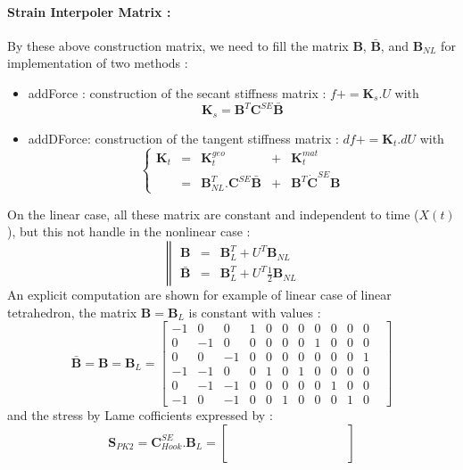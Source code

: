 \documentclass[a4paper,10pt]{article}
\begin{document}
\paragraph{Strain Interpoler Matrix :} By these above construction matrix, we need to fill the matrix $\textbf{B}$, $\bar{\textbf{B}}$, and $\textbf{B}_{NL}$ for implementation of two methods :
\begin{itemize}
 \item addForce : construction of the secant stiffness matrix : $f+= \textbf{K}_s.U $ with
      \[     \textbf{K}_s =  \textbf{B}^T \textbf{C}^{SE}\bar{\textbf{B}}   \]
 \item addDForce: construction of the tangent stiffness matrix : $df+= \textbf{K}_t.dU $ with
      \[
      \left\{ 
      \begin{array}{ccccc}
	\textbf{K}_t   &=& \textbf{K}^{geo}_t &+& \textbf{K}^{mat}_t \\
                       &=& \textbf{B}^T_{NL}.\textbf{C}^{SE} \bar{\textbf{B}} & + &\textbf{B}^T \dot{\textbf{C}}^{SE} \textbf{B} 
      \end{array}\right.
      \]
\end{itemize}
On the linear case, all these matrix are constant and independent to time ($X(t)$), but this not handle in the nonlinear case : 
\[
\left\| 
\begin{array}{rcl}
      \textbf{B}   &=&  \textbf{B}^T_L +  U^T \textbf{B}_{NL}                               \\ 
 \bar{\textbf{B}}  &=&  \textbf{B}^T_L +  U^T \frac{1}{2}\textbf{B}_{NL}           
\end{array}\right.
\]
An explicit computation are shown for example of linear case of linear tetrahedron, the matrix $\textbf{B}=\textbf{B}_L$ is constant with values : 
\[
\bar{\textbf{B}}=\textbf{B}=\textbf{B}_L=
\left[ 
\begin{array}{cccccccccccc}
-1 &  0 &  0 & 1 & 0 & 0 & 0 & 0 & 0 & 0 & 0 & \\
 0 & -1 &  0 & 0 & 0 & 0 & 0 & 1 & 0 & 0 & 0 & \\
 0 &  0 & -1 & 0 & 0 & 0 & 0 & 0 & 0 & 0 & 1 & \\
-1 & -1 &  0 & 0 & 1 & 0 & 1 & 0 & 0 & 0 & 0 & \\
 0 & -1 & -1 & 0 & 0 & 0 & 0 & 0 & 1 & 0 & 0 & \\
-1 &  0 & -1 & 0 & 0 & 1 & 0 & 0 & 0 & 1 & 0 &         
\end{array}
\right]
\]
and the stress by Lame cofficients expressed by :
\[
\textbf{S}_{PK2}=\textbf{C}^{SE}_{Hook}.\textbf{B}_{L}=
\left[ 
\begin{array}{cccccccccccc}
 & & & & & & & & & & & \\
 & & & & & & & & & & & \\
 & & & & & & & & & & & \\
 & & & & & & & & & & & \\
 & & & & & & & & & & & \\
 & & & & & & & & & & &         
\end{array}
\right]
\]
\end{document}
